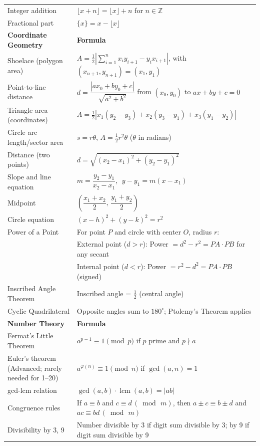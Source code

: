 \documentclass{article}
\begin{document}
\begin{center}
\begin{tabularx}{\textwidth}{|>{\raggedright\arraybackslash}X|>{\raggedright\arraybackslash}X|}
Integer addition & $\lfloor x+n \rfloor = \lfloor x \rfloor + n$ for $n \in \mathbb{Z}$ \\
Fractional part & $\{x\} = x - \lfloor x \rfloor$ \\
\hline
\textbf{Coordinate Geometry} & \textbf{Formula} \\
\hline
Shoelace (polygon area) & $A = \tfrac{1}{2}\left|\sum_{i=1}^{n} x_i y_{i+1} - y_i x_{i+1}\right|$, with $(x_{n+1},y_{n+1})=(x_1,y_1)$ \\
Point-to-line distance & $d=\dfrac{|ax_0+by_0+c|}{\sqrt{a^2+b^2}}$ from $(x_0,y_0)$ to $ax+by+c=0$ \\
Triangle area (coordinates) & $A=\tfrac{1}{2}|x_1(y_2-y_3)+x_2(y_3-y_1)+x_3(y_1-y_2)|$ \\
Circle arc length/sector area & $s=r\theta$, $A=\tfrac{1}{2}r^2\theta$ (\(\theta\) in radians) \\
Distance (two points) & $d=\sqrt{(x_2-x_1)^2+(y_2-y_1)^2}$ \\
Slope and line equation & $m=\dfrac{y_2-y_1}{x_2-x_1}$, $\;y-y_1=m(x-x_1)$ \\
Midpoint & $\left(\dfrac{x_1+x_2}{2},\,\dfrac{y_1+y_2}{2}\right)$ \\
Circle equation & $(x-h)^2+(y-k)^2=r^2$ \\
Power of a Point & For point $P$ and circle with center $O$, radius $r$: \\
& External point ($d > r$): Power $= d^2 - r^2 = PA \cdot PB$ for any secant \\
& Internal point ($d < r$): Power $= r^2 - d^2 = PA \cdot PB$ (signed) \\
Inscribed Angle Theorem & Inscribed angle = $\tfrac{1}{2}$ (central angle) \\
Cyclic Quadrilateral & Opposite angles sum to $180^\circ$; Ptolemy's Theorem applies \\
\hline
\textbf{Number Theory} & \textbf{Formula} \\
\hline
Fermat's Little Theorem & $a^{p-1}\equiv 1 \pmod p$ if $p$ prime and $p\nmid a$ \\
Euler's theorem (Advanced; rarely needed for 1--20) & $a^{\varphi(n)}\equiv 1 \pmod n$ if $\gcd(a,n)=1$ \\
gcd-lcm relation & $\gcd(a,b)\cdot \operatorname{lcm}(a,b)=|ab|$ \\
Congruence rules & If $a\equiv b$ and $c\equiv d\,(\bmod\,m)$, then $a\pm c\equiv b\pm d$ and $ac\equiv bd\,(\bmod\,m)$ \\
Divisibility by 3, 9 & Number divisible by 3 if digit sum divisible by 3; by 9 if digit sum divisible by 9 \\

\end{tabularx}
\end{center}
\end{document}
